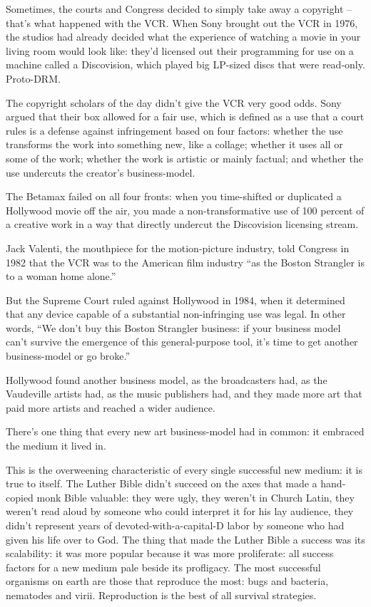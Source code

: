 Sometimes, the courts and Congress decided to simply take away a
copyright -- that's what happened with the VCR. When Sony brought
out the VCR in 1976, the studios had already decided what the
experience of watching a movie in your living room would look like:
they'd licensed out their programming for use on a machine called a
Discovision, which played big LP-sized discs that were read-only.
Proto-DRM.

The copyright scholars of the day didn't give the VCR very good
odds. Sony argued that their box allowed for a fair use, which is
defined as a use that a court rules is a defense against
infringement based on four factors: whether the use transforms the
work into something new, like a collage; whether it uses all or
some of the work; whether the work is artistic or mainly factual;
and whether the use undercuts the creator's business-model.

The Betamax failed on all four fronts: when you time-shifted or
duplicated a Hollywood movie off the air, you made a
non-transformative use of 100 percent of a creative work in a way
that directly undercut the Discovision licensing stream.

Jack Valenti, the mouthpiece for the motion-picture industry, told
Congress in 1982 that the VCR was to the American film industry ``as
the Boston Strangler is to a woman home alone.''

But the Supreme Court ruled against Hollywood in 1984, when it
determined that any device capable of a substantial non-infringing
use was legal. In other words, ``We don't buy this Boston Strangler
business: if your business model can't survive the emergence of
this general-purpose tool, it's time to get another business-model
or go broke.''

Hollywood found another business model, as the broadcasters had, as
the Vaudeville artists had, as the music publishers had, and they
made more art that paid more artists and reached a wider audience.

There's one thing that every new art business-model had in common:
it embraced the medium it lived in.

This is the overweening characteristic of every single successful
new medium: it is true to itself. The Luther Bible didn't succeed
on the axes that made a hand-copied monk Bible valuable: they were
ugly, they weren't in Church Latin, they weren't read aloud by
someone who could interpret it for his lay audience, they didn't
represent years of devoted-with-a-capital-D labor by someone who
had given his life over to God. The thing that made the Luther
Bible a success was its scalability: it was more popular because it
was more proliferate: all success factors for a new medium pale
beside its profligacy. The most successful organisms on earth are
those that reproduce the most: bugs and bacteria, nematodes and
virii. Reproduction is the best of all survival strategies.

